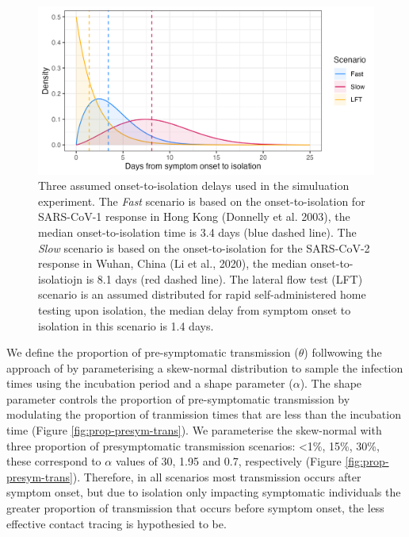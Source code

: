 \documentclass{article}
\begin{document}
\begin{figure}[ht]
\centering
\includegraphics[width=\textwidth]{../plots/onset_to_isolation.png}
\caption{Three assumed onset-to-isolation delays used in the simuluation experiment. The \textit{Fast} scenario is based on the onset-to-isolation for SARS-CoV-1 response in Hong Kong (Donnelly et al. 2003), the median onset-to-isolation time is 3.4 days (blue dashed line). The \textit{Slow} scenario is based on the onset-to-isolation for the SARS-CoV-2 response in Wuhan, China (Li et al., 2020), the median onset-to-isolatiojn is 8.1 days (red dashed line). The lateral flow test (LFT) scenario is an assumed distributed for rapid self-administered home testing upon isolation, the median delay from symptom onset to isolation in this scenario is 1.4 days.}
\label{fig:onset-to-isolation}
\end{figure}

\clearpage

We define the proportion of pre-symptomatic transmission ($\theta$) follwowing the approach of \cite{hellewellFeasibilityControllingCOVID192020} by parameterising a skew-normal distribution to sample the infection times using the incubation period and a shape parameter ($\alpha$). The shape parameter controls the proportion of pre-symptomatic transmission by modulating the proportion of tranmission times that are less than the incubation time (Figure \ref{fig:prop-presym-trans}). We parameterise the skew-normal with three proportion of presymptomatic transmission scenarios: <1\%, 15\%, 30\%, these correspond to $\alpha$ values of 30, 1.95 and 0.7, respectively (Figure \ref{fig:prop-presym-trans}). Therefore, in all scenarios most transmission occurs after symptom onset, but due to isolation only impacting symptomatic individuals the greater proportion of transmission that occurs before symptom onset, the less effective contact tracing is hypothesied to be. \\
\end{document}
